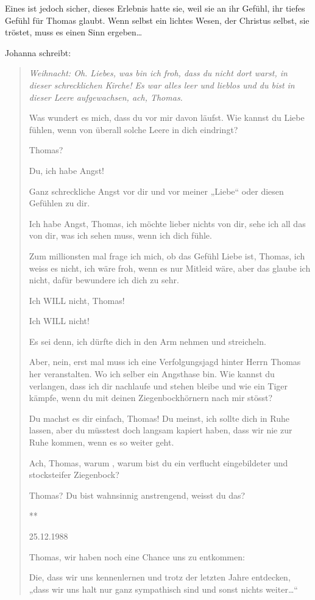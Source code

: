 \documentclass[10pt,titlepage,a5paper]{book}
\newcommand{\sterne}{\par{\centering ***\par}}
\newenvironment{tg}{\begin{quote}\em}{\end{quote}}
\begin{document}
Eines ist jedoch sicher, dieses Erlebnis hatte sie, weil sie an ihr Gefühl, ihr tiefes Gefühl für Thomas  glaubt. Wenn selbst ein lichtes Wesen, der Christus selbst, sie tröstet, muss es einen Sinn ergeben\dots 

Johanna schreibt:

\begin{tg} 
Weihnacht:
Oh. Liebes, was bin ich froh, dass du nicht dort warst, in dieser schrecklichen Kirche! Es war alles leer und lieblos und du bist in dieser Leere aufgewachsen, ach, Thomas.

Was wundert es mich, dass du vor mir davon läufst. Wie kannst du Liebe fühlen, wenn von überall solche Leere in dich eindringt?

Thomas?

Du, ich habe Angst!

Ganz schreckliche Angst vor dir und vor meiner „Liebe“ oder diesen Gefühlen zu dir.

Ich habe Angst, Thomas, ich möchte lieber nichts von dir, sehe ich all das von dir, was ich sehen muss, wenn ich dich fühle.

Zum millionsten mal frage ich mich, ob das Gefühl Liebe ist, Thomas, ich weiss es nicht, ich wäre froh, wenn es nur Mitleid wäre, aber das glaube ich nicht, dafür bewundere ich dich zu sehr.

Ich WILL nicht, Thomas!

Ich WILL nicht!

Es sei denn, ich dürfte dich in den Arm nehmen und streicheln.

Aber, nein, erst mal muss ich eine Verfolgungsjagd hinter Herrn Thomas her veranstalten. Wo ich selber ein Angsthase bin. Wie kannst du verlangen, dass ich dir nachlaufe und stehen bleibe und wie ein Tiger kämpfe, wenn du mit deinen Ziegenbockhörnern nach mir stösst?

Du machst es dir einfach, Thomas! Du meinst, ich sollte dich in Ruhe lassen, aber du müsstest doch langsam kapiert haben, dass wir nie zur Ruhe kommen, wenn es so weiter geht.

Ach, Thomas, warum , warum bist du ein verflucht eingebildeter und stocksteifer Ziegenbock?

Thomas? Du bist wahnsinnig anstrengend, weisst du das?


\sterne


25.12.1988

Thomas, wir haben noch eine Chance uns zu entkommen:

Die, dass wir uns kennenlernen und trotz der letzten Jahre entdecken, „dass wir uns halt nur ganz sympathisch sind und sonst nichts weiter\dots “


\end{tg}
\end{document}
